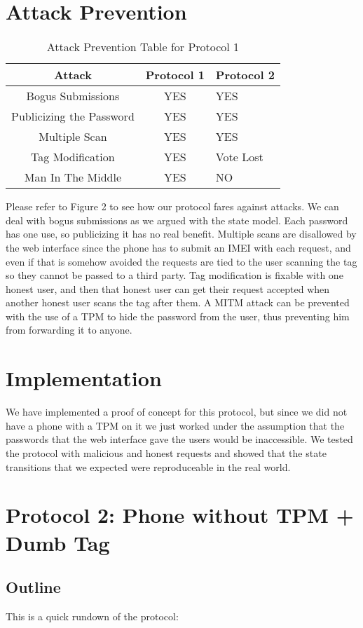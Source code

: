\documentclass{sig-alternate}
\begin{document}
\section{Attack Prevention}
\begin{table}
\centering
\caption{Attack Prevention Table for Protocol 1}
\begin{tabular}{|c|c|l|} \hline
Attack&Protocol 1&Protocol 2\\ \hline
Bogus Submissions & YES & YES\\ \hline
Publicizing the Password& YES & YES\\ \hline
Multiple Scan& YES & YES\\ \hline
Tag Modification& YES & Vote Lost\\ \hline
Man In The Middle& YES & NO\\
\hline\end{tabular}
\end{table}


Please refer to Figure 2 to see how our protocol fares against
attacks. We can deal with bogus submissions as we argued with the
state model. Each password has one use, so publicizing it has no real
benefit. Multiple scans are disallowed by the web interface since the
phone has to submit an IMEI with each request, and even if that is
somehow avoided the requests are tied to the user scanning the tag so
they cannot be passed to a third party. Tag modification is fixable
with one honest user, and then that honest user can get their request
accepted when another honest user scans the tag after them. A MITM
attack can be prevented with the use of a TPM to hide the password
from the user, thus preventing him from forwarding it to anyone.

\section{Implementation}
We have implemented a proof of concept for this protocol, but since we
did not have a phone with a TPM on it we just worked under the
assumption that the passwords that the web interface gave the users
would be inaccessible. We tested the protocol with malicious and
honest requests and showed that the state transitions that we expected
were reproduceable in the real world.

\section{Protocol 2: Phone without TPM + Dumb Tag}
\subsection{Outline}
This is a quick rundown of the protocol:
\end{document}
